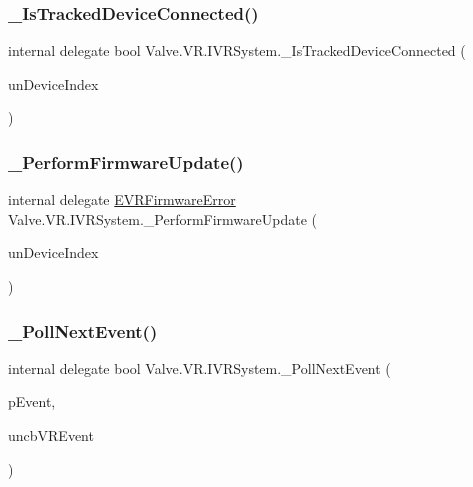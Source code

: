 \subsubsection{\texorpdfstring{\_IsTrackedDeviceConnected()}{\_IsTrackedDeviceConnected()}}
{\footnotesize\ttfamily internal delegate bool Valve.\+V\+R.\+I\+V\+R\+System.\+\_\+\+Is\+Tracked\+Device\+Connected (\begin{DoxyParamCaption}\item[{uint}]{un\+Device\+Index }\end{DoxyParamCaption})}

\mbox{\label{struct_valve_1_1_v_r_1_1_i_v_r_system_ab19faf642558ef1a557fb70618db9ba3}} 
\subsubsection{\texorpdfstring{\_PerformFirmwareUpdate()}{\_PerformFirmwareUpdate()}}
{\footnotesize\ttfamily internal delegate \mbox{\hyperlink{namespace_valve_1_1_v_r_a07c3927041d6bb490e61ca27612c41ff}{E\+V\+R\+Firmware\+Error}} Valve.\+V\+R.\+I\+V\+R\+System.\+\_\+\+Perform\+Firmware\+Update (\begin{DoxyParamCaption}\item[{uint}]{un\+Device\+Index }\end{DoxyParamCaption})}

\mbox{\label{struct_valve_1_1_v_r_1_1_i_v_r_system_ad05dee46b825b66c941f09a69ddc2a13}} 
\subsubsection{\texorpdfstring{\_PollNextEvent()}{\_PollNextEvent()}}
{\footnotesize\ttfamily internal delegate bool Valve.\+V\+R.\+I\+V\+R\+System.\+\_\+\+Poll\+Next\+Event (\begin{DoxyParamCaption}\item[{ref \mbox{\hyperlink{struct_valve_1_1_v_r_1_1_v_r_event__t}{V\+R\+Event\+\_\+t}}}]{p\+Event,  }\item[{uint}]{uncb\+V\+R\+Event }\end{DoxyParamCaption})}


